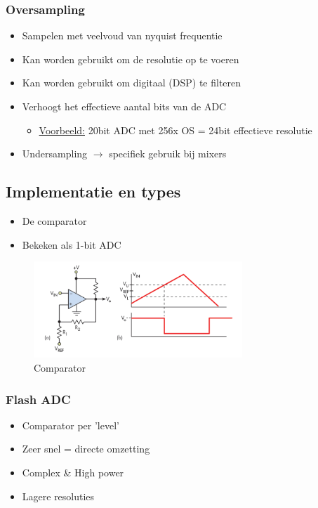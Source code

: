 \documentclass{article}
\begin{document}
\subsubsection{Oversampling}
\begin{itemize}
    \item Sampelen met veelvoud van nyquist frequentie
    \item Kan worden gebruikt om de resolutie op te voeren
    \item Kan worden gebruikt om digitaal (DSP) te filteren
    \item Verhoogt het effectieve aantal bits van de ADC
    \begin{itemize}
        \item \underline{Voorbeeld:} 20bit ADC met 256x OS = 24bit effectieve resolutie
    \end{itemize}
    \item Undersampling $\rightarrow$ specifiek gebruik bij mixers
\end{itemize}

\subsection{Implementatie en types}
\begin{itemize}
    \item De comparator
    \item Bekeken als 1-bit ADC
\end{itemize}

\begin{figure}[H]
    \centering
    \includegraphics[width=0.7\textwidth]{Screenshot_20200224_122504.png}
    \caption{Comparator}
\end{figure}

\subsubsection{Flash ADC}
\begin{itemize}
    \item Comparator per 'level'
    \item Zeer snel = directe omzetting
    \item Complex \& High power
    \item Lagere resoluties
\end{itemize}
\end{document}
